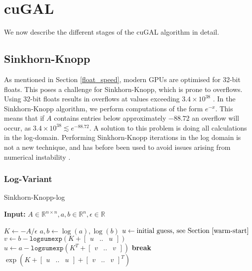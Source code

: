 
\section{cuGAL}
We now describe the different stages of the cuGAL algorithm in detail.

\subsection{Sinkhorn-Knopp}
As mentioned in Section \ref{float_speed}, modern GPUs are optimised for 32-bit floats. This poses a challenge for Sinkhorn-Knopp, which is prone to overflows. Using 32-bit floats results in overflows at values exceeding $3.4 \times 10^{38}$ \citep{ieeefloat}. In the Sinkhorn-Knopp algorithm, we perform computations of the form $e^{-x}$. This means that if $A$ contains entries below approximately $-88.72$ an overflow will occur, as $3.4 \times 10^{38} \lesssim e^{-88.72}$. A solution to this problem is doing all calculations in the log-domain. Performing Sinkhorn-Knopp iterations in the log domain is not a new technique, and has before been used to avoid issues arising from numerical instability \citep{chizat2017sinkhornlog}. %

\subsubsection{Log-Variant}
\begin{algorithm}[H]
\caption{Sinkhorn-Knopp-log}\label{alg:sinkhorn_log}
\textbf{Input:} $A \in \mathds{R}^{n \times n}, a, b \in \mathds{R}^{n}, \epsilon \in \mathds{R}$
\begin{algorithmic}[1]
\State $K \gets -A / \epsilon$
\State $a, b \gets \log(a), \log(b)$
\State $u \gets \text{initial guess, see Section \ref{warm-start}}$
    \State $v \gets b - \texttt{logsumexp}(K + \begin{bmatrix} u & .. & u \end{bmatrix})$ 
    \State $u \gets a - \texttt{logsumexp}(K^T + \begin{bmatrix} v & .. & v \end{bmatrix})$ 
        \State \textbf{break}
    \EndIf
\EndFor
\State \Return $\exp(K + \begin{bmatrix} u & .. & u \end{bmatrix} + \begin{bmatrix} v & .. & v \end{bmatrix}^T)$
\end{algorithmic}
\end{algorithm}

